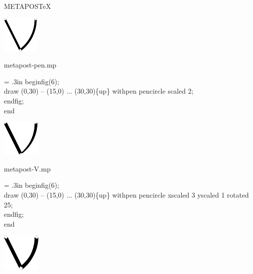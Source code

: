 \documentclass[danish,a2paper,11pt]{scrartcl}
\begin{document}


\begin{center}
\color{White}
\normalfont\logofamily
\Huge METAPOS{\TeX}
\vspace{2cm}
\end{center}

\begin{multicols*}{3}

\center
\includegraphics[scale=4.5]{metapost-pen/metapost-pen-1.pdf}
\vspace{1cm}

\flushleft
\color{White}
\romansmall
metapost-pen.mp\\
\vspace{.4cm}
\color{Black}
\typewritersmall
{\leftskip = .3in
beginfig(6);\\
draw (0,30) -- (15,0) ... (30,30)\{up\} withpen pencircle scaled 2;\\
endfig;\\
end
\par}
\vspace{2cm}

\center
\includegraphics[scale=4.5]{metapost-pen/metapost-pen-2.pdf}
\vspace{1cm}

\flushleft
\color{White}
\romansmall
metapost-V.mp\\
\vspace{.4cm}
\color{Black}
\typewritersmall
{\leftskip = .3in
beginfig(6);\\
draw (0,30) -- (15,0) ... (30,30)\{up\} withpen pencircle xscaled 3 yscaled 1 rotated 25;\\
endfig;\\
end
\par}
\vspace{2cm}

\center
\includegraphics[scale=4.5]{metapost-pen/metapost-pen-3.pdf}
\vspace{1cm}


\end{multicols*}
\end{document}
